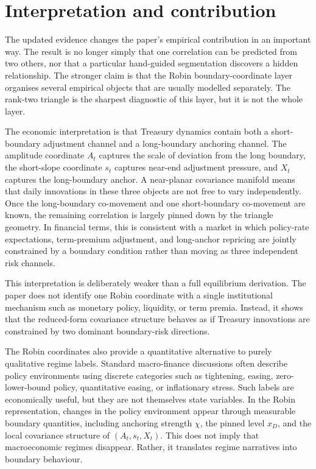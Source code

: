 \documentclass[11pt]{article}
\begin{document}
\section{Interpretation and contribution}

The updated evidence changes the paper's empirical contribution in an important way. The result is no longer simply that one correlation can be predicted from two others, nor that a particular hand-guided segmentation discovers a hidden relationship. The stronger claim is that the Robin boundary-coordinate layer organises several empirical objects that are usually modelled separately. The rank-two triangle is the sharpest diagnostic of this layer, but it is not the whole layer.

The economic interpretation is that Treasury dynamics contain both a short-boundary adjustment channel and a long-boundary anchoring channel. The amplitude coordinate $A_t$ captures the scale of deviation from the long boundary, the short-slope coordinate $s_t$ captures near-end adjustment pressure, and $X_t$ captures the long-boundary anchor. A near-planar covariance manifold means that daily innovations in these three objects are not free to vary independently. Once the long-boundary co-movement and one short-boundary co-movement are known, the remaining correlation is largely pinned down by the triangle geometry. In financial terms, this is consistent with a market in which policy-rate expectations, term-premium adjustment, and long-anchor repricing are jointly constrained by a boundary condition rather than moving as three independent risk channels.

This interpretation is deliberately weaker than a full equilibrium derivation. The paper does not identify one Robin coordinate with a single institutional mechanism such as monetary policy, liquidity, or term premia. Instead, it shows that the reduced-form covariance structure behaves as if Treasury innovations are constrained by two dominant boundary-risk directions.

The Robin coordinates also provide a quantitative alternative to purely qualitative regime labels. Standard macro-finance discussions often describe policy environments using discrete categories such as tightening, easing, zero-lower-bound policy, quantitative easing, or inflationary stress. Such labels are economically useful, but they are not themselves state variables. In the Robin representation, changes in the policy environment appear through measurable boundary quantities, including anchoring strength $\chi$, the pinned level $x_D$, and the local covariance structure of $(A_t,s_t,X_t)$. This does not imply that macroeconomic regimes disappear. Rather, it translates regime narratives into boundary behaviour.
\end{document}

